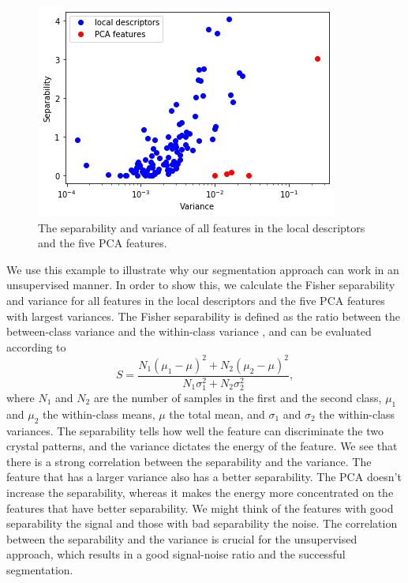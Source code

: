 \documentclass[twocolumn,amsmath, floatfix]{revtex4}
\begin{document}
\begin{figure}
    \centering
    \includegraphics[width=0.8\columnwidth]{separability_and_variance.png}
    \caption{ The separability and variance of all features in the local descriptors and the five PCA features.  }
    \label{fig:separability_and_variance}
\end{figure}
We use this example to illustrate why our segmentation approach can work in an unsupervised manner. In order to show this, we calculate the Fisher separability \cite{Fisher1936} and variance for all features in the local descriptors and the five PCA features with largest variances. The Fisher separability is defined as the ratio between the between-class variance and the within-class variance \cite{Fisher1936}, and can be evaluated according to
\begin{equation}
    S = \frac{N_1(\mu_1-\mu)^2 + N_2(\mu_2-\mu)^2}{
    N_1\sigma_1^2 + N_2 \sigma_2^2},
\end{equation}
where $N_1$ and $N_2$ are the number of samples in the first and the second class, $\mu_1$ and $\mu_2$ the within-class means, $\mu$ the total mean, and $\sigma_1$ and $\sigma_2$ the within-class variances. The separability tells how well the feature can discriminate the two crystal patterns, and the variance dictates the energy of the feature. We see that there is a strong correlation between the separability and the variance. The feature that has a larger variance also has a better separability. 
The PCA doesn't increase the separability, whereas it makes the energy more concentrated on the features that have better separability. We might think of the features with good separability the signal and those with bad separability the noise. The correlation between the separability and the variance is crucial for the unsupervised approach, which results in a good signal-noise ratio and the successful segmentation.   
\end{document}

